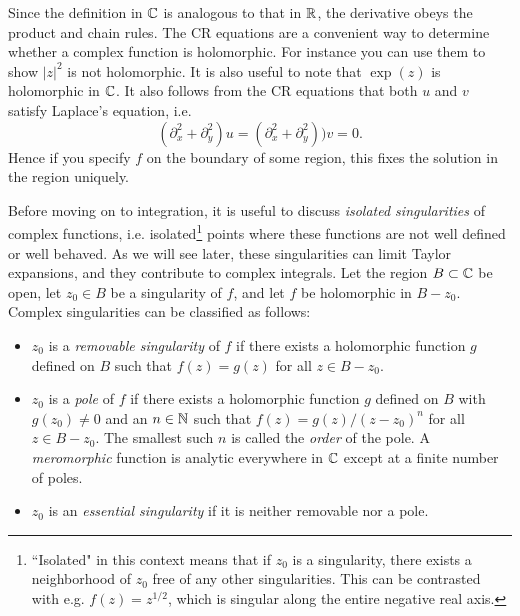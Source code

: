 Since the definition in $\mathbb{C}$ is analogous to that in $\mathbb{R}$, the derivative obeys
the product and chain rules. The CR equations are a convenient way
to determine whether a complex function is holomorphic. For instance you can
use them to show $|z|^2$ is not holomorphic. 
It is also useful to note that $\exp(z)$ is holomorphic in $\mathbb{C}$.
It also follows from the CR equations that both $u$ and $v$ satisfy
Laplace's equation, i.e.
\begin{equation}
\left(\partial_x^2+ \partial_y^2\right)u = \left(\partial_x^2
+\partial_y^2\right))v = 0.
\end{equation}
Hence if you specify $f$ on the boundary of some region, this fixes the solution
in the region uniquely.

Before moving on to integration, it is useful to discuss {\it isolated singularities} of
complex functions, i.e. isolated\footnote{``Isolated" in this context means that if
$z_0$ is a singularity, there exists a neighborhood of $z_0$ free of any other
singularities. This can be contrasted with e.g. $f(z)=z^{1/2}$, which is
singular along the entire negative real axis.} 
points where these functions are not well defined
or well behaved. As we will see later, these singularities can limit Taylor
expansions, and they contribute to complex integrals. 
Let the region $B\subset\mathbb{C}$ be open, let $z_0\in B$ be a singularity of $f$, 
and let $f$ be holomorphic in $B-z_0$. Complex singularities
can be classified as follows:
\begin{itemize}
  \item $z_0$ is a {\it removable singularity} of $f$ if there exists a
        holomorphic function $g$ defined on $B$ such that $f(z) = g(z)$ for all
        $z\in B-z_0$.
  \item $z_0$ is a {\it pole} of $f$ if there exists a holomorphic function $g$
        defined on $B$ with $g(z_0)\neq0$ and an $n\in\mathbb{N}$ such that 
        $f(z) = g(z) / (z-z_0)^n$ for all $z\in B-z_0$. The smallest such $n$ 
        is called the {\it order} of the pole. A {\it meromorphic} function
         is analytic everywhere in $\mathbb{C}$ except at a finite
        number of poles.
  \item $z_0$ is an {\it essential singularity} if it is neither removable nor a
        pole.
\end{itemize}

